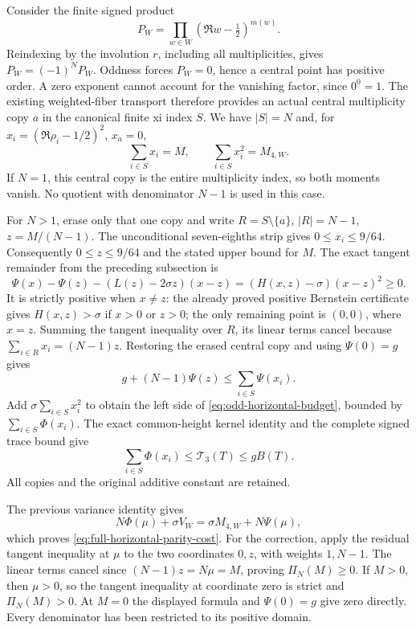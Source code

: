 Consider the finite signed product
\[
 P_W=\prod_{w\in W}(\Re w-\tfrac12)^{m(w)}.
\]
Reindexing by the involution \(r\), including all multiplicities, gives
\(P_W=(-1)^NP_W\).  Oddness forces \(P_W=0\), hence a central point
has positive order.  A zero exponent cannot account for the vanishing
factor, since \(0^0=1\).  The existing weighted-fiber transport therefore
provides an actual central multiplicity copy \(a\) in the canonical
finite xi index \(S\).  We have \(|S|=N\) and, for
\(x_i=(\Re\rho_i-1/2)^2\), \(x_a=0\),
\[
  \sum_{i\in S}x_i=M,\qquad
  \sum_{i\in S}x_i^2=M_{4,W}.
\]
If \(N=1\), this central copy is the entire multiplicity index, so both
moments vanish.  No quotient with denominator \(N-1\) is used in this case.

For \(N>1\), erase only that one copy and write
\(R=S\setminus\{a\}\), \(|R|=N-1\),
\(z=M/(N-1)\).  The unconditional seven-eighths strip gives
\(0\le x_i\le9/64\).  Consequently \(0\le z\le9/64\) and the stated
upper bound for \(M\).  The exact tangent remainder from the preceding
subsection is
\[
 \Psi(x)-\Psi(z)-(L(z)-2\sigma z)(x-z)
   =(H(x,z)-\sigma)(x-z)^2\ge0.
\]
It is strictly positive when \(x\ne z\): the already proved positive
Bernstein certificate gives \(H(x,z)>\sigma\) if \(x>0\) or \(z>0\);
the only remaining point is \((0,0)\), where \(x=z\).
Summing the tangent inequality over \(R\), its linear terms cancel
because \(\sum_{i\in R}x_i=(N-1)z\).  Restoring the erased central copy
and using \(\Psi(0)=g\) gives
\[
 g+(N-1)\Psi(z)\le\sum_{i\in S}\Psi(x_i).
\]
Add \(\sigma\sum_{i\in S}x_i^2\) to obtain the left side of
\eqref{eq:odd-horizontal-budget}, bounded by \(\sum_{i\in S}\Phi(x_i)\).
The exact common-height kernel identity and the complete signed trace
bound give
\[
 \sum_{i\in S}\Phi(x_i)
 \le\mathcal T_3(T)\le gB(T).
\]
All copies and the original additive constant are retained.

The previous variance identity gives
\[
 N\Phi(\mu)+\sigma V_W=\sigma M_{4,W}+N\Psi(\mu),
\]
which proves \eqref{eq:full-horizontal-parity-cost}.
For the correction, apply the residual tangent inequality at \(\mu\)
to the two coordinates \(0,z\), with weights \(1,N-1\).
The linear terms cancel since \((N-1)z=N\mu=M\), proving
\(\Pi_N(M)\ge0\).  If \(M>0\), then \(\mu>0\), so the tangent
inequality at coordinate zero is strict and \(\Pi_N(M)>0\).
At \(M=0\) the displayed formula and \(\Psi(0)=g\) give zero directly.
Every denominator has been restricted to its positive domain.
